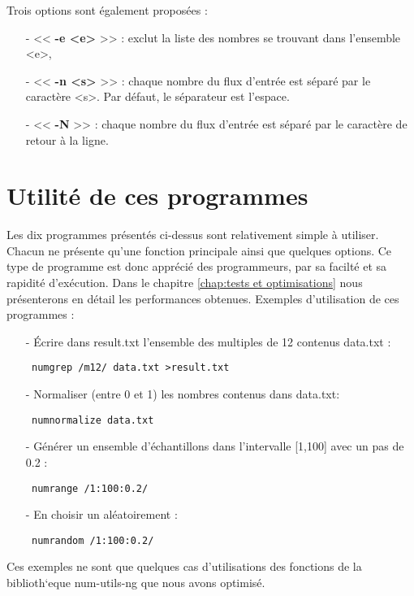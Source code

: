 \begin{itemize}
\begin{itemize}
\end{itemize}
Trois options sont \'egalement propos\'ees :
\begin{itemize}
 \item[-] << \textbf{-e <e>} >> : exclut la liste des nombres se trouvant dans l'ensemble <e>,
 \item[-] << \textbf{-n <s>} >> : chaque nombre du flux d'entr\'ee est s\'epar\'e par le caract\`ere <s>. Par d\'efaut, le s\'eparateur est l'espace.
 \item[-] << \textbf{-N} >> : chaque nombre du flux d'entr\'ee est s\'epar\'e par le caract\`ere de retour \`a la ligne.
\end{itemize}
\end{itemize}

\section{Utilit\'e de ces programmes}

Les dix programmes pr\'esent\'es ci-dessus sont relativement simple \`a utiliser. Chacun ne pr\'esente qu'une fonction principale ainsi que quelques options.
Ce type de programme est donc appr\'eci\'e des programmeurs, par sa facilt\'e et sa rapidit\'e d'ex\'ecution. Dans le chapitre \ref{chap:tests et optimisations}
nous pr\'esenterons en d\'etail les performances obtenues.
\newline
Exemples d'utilisation de ces programmes :
\begin{itemize}
 \item[-] \'Ecrire dans result.txt l'ensemble des multiples de 12 contenus data.txt :
 \begin{verbatim} numgrep /m12/ data.txt >result.txt \end{verbatim}
 \item[-] Normaliser (entre 0 et 1) les nombres contenus dans data.txt:
 \begin{verbatim} numnormalize data.txt \end{verbatim}
 \item[-] G\'en\'erer un ensemble d'\'echantillons dans l'intervalle [1,100] avec un pas de 0.2 :
 \begin{verbatim} numrange /1:100:0.2/ \end{verbatim}
 \item[-] En choisir un al\'eatoirement :
 \begin{verbatim} numrandom /1:100:0.2/ \end{verbatim}
\end{itemize}

Ces exemples ne sont que quelques cas d'utilisations des fonctions de la biblioth`eque num-utils-ng que nous avons optimis\'e.



